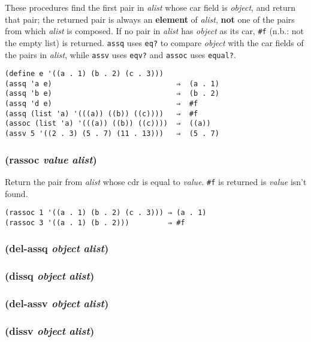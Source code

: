 \documentclass{article}
\begin{document}
These procedures find the first pair in \emph{alist} whose car field is \emph{object}, and
return that pair; the returned pair is always an \textbf{element} of \emph{alist},
\textbf{not} one of the pairs from which \emph{alist} is composed. If no pair in \emph{alist}
has \emph{object} as its car, \verb|#f| (n.b.: not the empty list) is returned.
\verb|assq| uses \verb|eq?| to compare \emph{object} with the car fields of the pairs in
\emph{alist}, while \verb|assv| uses \verb|eqv?| and \verb|assoc| uses \verb|equal?|.

\begin{verbatim}
(define e '((a . 1) (b . 2) (c . 3)))
(assq 'a e)                             ⇒  (a . 1)
(assq 'b e)                             ⇒  (b . 2)
(assq 'd e)                             ⇒  #f
(assq (list 'a) '(((a)) ((b)) ((c))))   ⇒  #f
(assoc (list 'a) '(((a)) ((b)) ((c))))  ⇒  ((a))
(assv 5 '((2 . 3) (5 . 7) (11 . 13)))   ⇒  (5 . 7)
\end{verbatim}

\subsubsection{(rassoc \emph{value} \emph{alist})}

Return the pair from \emph{alist} whose cdr is equal to \emph{value}. \verb|#f| is returned
is \emph{value} isn’t found.

\begin{verbatim}
(rassoc 1 '((a . 1) (b . 2) (c . 3))) ⇒ (a . 1)
(rassoc 3 '((a . 1) (b . 2)))         ⇒ #f
\end{verbatim}

\subsubsection{(del-assq \emph{object} \emph{alist})}

\subsubsection{(dissq \emph{object} \emph{alist})}

\subsubsection{(del-assv \emph{object} \emph{alist})}

\subsubsection{(dissv \emph{object} \emph{alist})}
\end{document}
